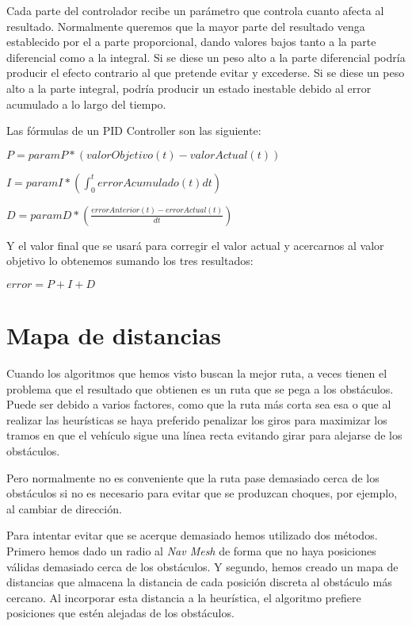 Cada parte del controlador recibe un parámetro que controla cuanto afecta al resultado. Normalmente queremos que la mayor parte del resultado venga establecido por el a parte proporcional, dando valores bajos tanto a la parte diferencial como a la integral. Si se diese un peso alto a la parte diferencial podría producir el efecto contrario al que pretende evitar y excederse. Si se diese un peso alto a la parte integral, podría producir un estado inestable debido al error acumulado a lo largo del tiempo.

Las fórmulas de un PID Controller son las siguiente:
\begin{center}
$P = paramP * (valorObjetivo(t) - valorActual(t))$

$I = paramI * (\displaystyle \int_{0}^{t} errorAcumulado(t) dt)$

$D = paramD * (\displaystyle \frac{errorAnterior(t)-errorActual(t)}{dt})$
\end{center}

Y el valor final que se usará para corregir el valor actual y acercarnos al valor objetivo lo obtenemos sumando los tres resultados:
\begin{center}
$error = P + I + D$
\end{center}

\section{Mapa de distancias}
Cuando los algoritmos que hemos visto buscan la mejor ruta, a veces tienen el problema que el resultado que obtienen es un ruta que se pega a los obstáculos. Puede ser debido a varios factores, como que la ruta más corta sea esa o que al realizar las heurísticas se haya preferido penalizar los giros para maximizar los tramos en que el vehículo sigue una línea recta evitando girar para alejarse de los obstáculos.

Pero normalmente no es conveniente que la ruta pase demasiado cerca de los obstáculos si no es necesario para evitar que se produzcan choques, por ejemplo, al cambiar de dirección.

Para intentar evitar que se acerque demasiado hemos utilizado dos métodos. Primero hemos dado un radio al \textit{Nav Mesh} de forma que no haya posiciones válidas demasiado cerca de los obstáculos. Y segundo, hemos creado un mapa de distancias que almacena la distancia de cada posición discreta al obstáculo más cercano. Al incorporar esta distancia a la heurística, el algoritmo prefiere posiciones que estén alejadas de los obstáculos.

